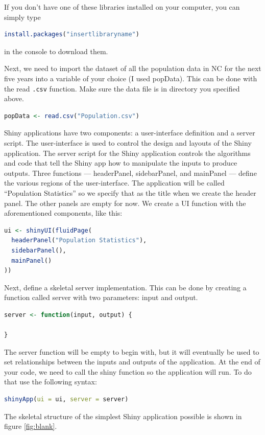\noindent If you don't have one of these libraries installed on your computer, you can simply type 
\begin{lstlisting}[language = R]
install.packages("insertlibraryname") 
\end{lstlisting}
in the console to download them. 

\noindent Next, we need to import the dataset of all the population data in NC for the next five years into a variable of your choice (I used popData).
This can be done with the read \texttt{.csv} function.
Make sure the data file is in directory you specified above. 

\begin{lstlisting}[language = R]
popData <- read.csv("Population.csv")
\end{lstlisting}
Shiny applications have two components: a user-interface definition and a server script.
The user-interface is used to control the design and layouts of the Shiny application.
The server script for the Shiny application controls the algorithms and code that tell the Shiny app how to manipulate the inputs to produce outputs.\cite{shiny} 
Three functions --- headerPanel, sidebarPanel, and mainPanel --- define the various regions of the user-interface.
The application will be called “Population Statistics” so we specify that as the title when we create the header panel.
The other panels are empty for now.
We create a UI function with the aforementioned components, like this:
\begin{lstlisting}[language = R]
ui <- shinyUI(fluidPage(
  headerPanel("Population Statistics"),
  sidebarPanel(),
  mainPanel()
))
\end{lstlisting}
Next, define a skeletal server implementation.
This can be done by creating a function called server with two parameters: input and output.
\begin{lstlisting}[language = R]
server <- function(input, output) {

}
\end{lstlisting}
The server function will be empty to begin with, but it will eventually be used to set relationships between the inputs and outputs of the application.
At the end of your code, we need to call the shiny function so the application will run.
To do that use the following syntax: 
\begin{lstlisting}[language = R]
shinyApp(ui = ui, server = server)
\end{lstlisting}
The skeletal structure of the simplest Shiny application possible is shown in figure \ref{fig:blank}. 
